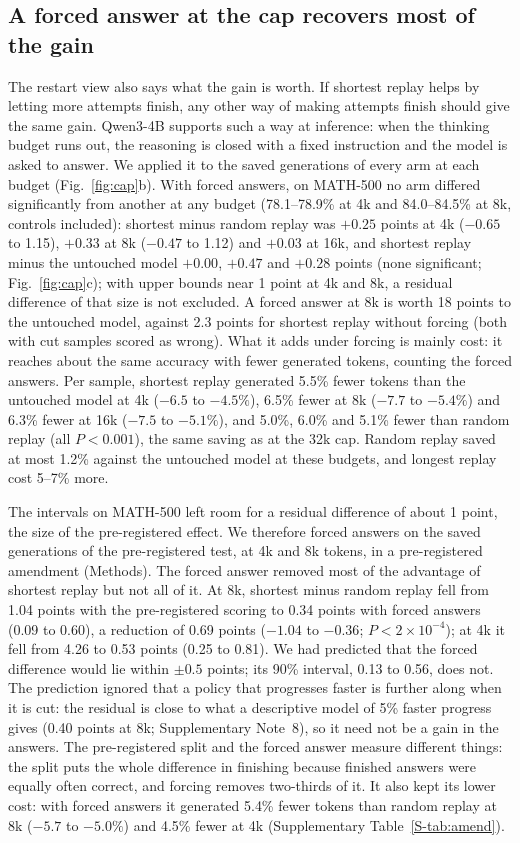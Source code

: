\documentclass[10pt]{article}
\newcommand{\sref}[1]{\ref{S-#1}}
\begin{document}
\subsection{A forced answer at the cap recovers most of the gain}
The restart view also says what the gain is worth. If shortest replay helps by letting more attempts finish, any other way of making attempts finish should give the same gain. Qwen3-4B supports such a way at inference: when the thinking budget runs out, the reasoning is closed with a fixed instruction and the model is asked to answer\cite{qwen3report,muennighoff2025s1}. We applied it to the saved generations of every arm at each budget (Fig.~\ref{fig:cap}b). With forced answers, on MATH-500 no arm differed significantly from another at any budget (78.1--78.9\% at 4k and 84.0--84.5\% at 8k, controls included): shortest minus random replay was $+0.25$ points at 4k ($-0.65$ to 1.15), $+0.33$ at 8k ($-0.47$ to 1.12) and $+0.03$ at 16k, and shortest replay minus the untouched model $+0.00$, $+0.47$ and $+0.28$ points (none significant; Fig.~\ref{fig:cap}c); with upper bounds near 1 point at 4k and 8k, a residual difference of that size is not excluded. A forced answer at 8k is worth 18 points to the untouched model, against 2.3 points for shortest replay without forcing (both with cut samples scored as wrong). What it adds under forcing is mainly cost: it reaches about the same accuracy with fewer generated tokens, counting the forced answers. Per sample, shortest replay generated 5.5\% fewer tokens than the untouched model at 4k ($-6.5$ to $-4.5\%$), 6.5\% fewer at 8k ($-7.7$ to $-5.4\%$) and 6.3\% fewer at 16k ($-7.5$ to $-5.1\%$), and 5.0\%, 6.0\% and 5.1\% fewer than random replay (all $P<0.001$), the same saving as at the 32k cap. Random replay saved at most 1.2\% against the untouched model at these budgets, and longest replay cost 5--7\% more.

The intervals on MATH-500 left room for a residual difference of about 1 point, the size of the pre-registered effect. We therefore forced answers on the saved generations of the pre-registered test, at 4k and 8k tokens, in a pre-registered amendment (Methods). The forced answer removed most of the advantage of shortest replay but not all of it. At 8k, shortest minus random replay fell from 1.04 points with the pre-registered scoring to 0.34 points with forced answers (0.09 to 0.60), a reduction of 0.69 points ($-1.04$ to $-0.36$; $P<2\times10^{-4}$); at 4k it fell from 4.26 to 0.53 points (0.25 to 0.81). We had predicted that the forced difference would lie within $\pm0.5$ points; its 90\% interval, 0.13 to 0.56, does not. The prediction ignored that a policy that progresses faster is further along when it is cut: the residual is close to what a descriptive model of 5\% faster progress gives (0.40 points at 8k; Supplementary Note~8), so it need not be a gain in the answers. The pre-registered split and the forced answer measure different things: the split puts the whole difference in finishing because finished answers were equally often correct, and forcing removes two-thirds of it. It also kept its lower cost: with forced answers it generated 5.4\% fewer tokens than random replay at 8k ($-5.7$ to $-5.0\%$) and 4.5\% fewer at 4k (Supplementary Table~\sref{tab:amend}).
\end{document}
